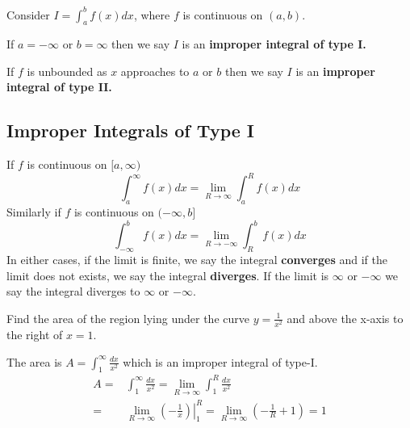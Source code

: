 \documentclass[calc1-main.tex]{subfiles}
\begin{document}
Consider $I = \displaystyle \int_a^b f(x) dx$, where $f$ is continuous on $(a, b)$.

If $a=-\infty$ or $b=\infty$ then we say $I$ is an \textbf{improper integral of type I.}

If $f$ is unbounded as $x$ approaches to $a$ or $b$ then we say $I$ is an \textbf{improper integral of type II.}

\subsection*{Improper Integrals of Type I}
\begin{definition}
  If $f$ is continuous on $[a, \infty)$
  \[
    \int_a^{\infty} f(x) dx = \lim_{R \to \infty} \int_a^R f(x) dx
  \]
  Similarly if $f$ is continuous on $(-\infty, b]$
  \[
    \int_{-\infty}^b f(x) dx = \lim_{R \to -\infty} \int_R^b f(x) dx
  \]
  In either cases, if the limit is finite, we say the integral \textbf{converges} and if the limit does not exists, we say the integral \textbf{diverges}. If the limit is $\infty$ or $-\infty$ we say the integral diverges to $\infty$ or $-\infty$.
\end{definition}

\begin{example}
	Find the area of the region lying under the curve $y=\frac{1}{x^2}$ and above the x-axis to the right of $x=1$.
\end{example}

\begin{minipage}{0.5\textwidth}
  \begin{solution}
  	The area is $A = \displaystyle \int_1^{\infty} \frac{dx}{x^2}$ which is an improper integral  of type-I.
  	\[
  	\begin{split}
  		A = &
  		\int_1^{\infty} \frac{dx}{x^2} = \lim_{R \to \infty} \int_1^R \frac{dx}{x^2} \\
  		= & \lim_{R \to \infty} \left.\left( -\frac{1}{x} \right)\right \vert_1^R=
  		\lim_{R \to \infty} \left( -\frac{1}{R} + 1 \right) =
  		1
  	\end{split}
  	\]
  \end{solution}
\end{minipage}%
\begin{minipage}{0.5\textwidth}
	\begin{figure}[H]
  \centering
	\end{figure}
\end{minipage}
\end{document}
